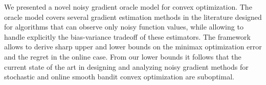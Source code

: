 We presented a novel noisy  gradient oracle model for convex optimization. The oracle model covers several gradient estimation methods in the literature designed for algorithms that can observe only noisy function values, while allowing to handle explicitly the bias-variance tradeoff of these estimators. The framework allows to derive sharp upper and lower bounds on the minimax optimization error and the regret in the online case. From our lower bounds it follows that the current state of the art in designing and analyzing noisy gradient methods for stochastic and online smooth bandit convex optimization are suboptimal.
